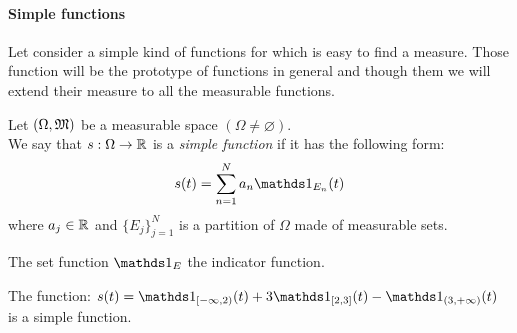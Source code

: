 \paragraph{Simple functions} Let consider a simple kind of functions for which is easy to find a measure. Those function will be the prototype of functions in general and though them we will extend their measure to all the measurable functions.

\begin{defn}\label{simple-function}
	Let $\left(\Omega,\mathfrak M\right)$ be a measurable space $\left(\Omega \neq \varnothing\right)$.\\
	We say that $s:\Omega \to \mathbb R$ is a \emph{simple function} if it has the following form: $$s(t)=\sum_{n=1}^N a_n\Ind_{E_n}(t)$$
	where $a_j \in \mathbb R$ and $\{E_j\}_{j=1}^N$ is a partition of $\Omega$ made of measurable sets.
\end{defn}

The set function $\Ind_{E}$ the indicator function.

\begin{exam}\label{ex:simple-functions}
	The function: $s(t)=\Ind_{[-\infty,2)}(t)+3\Ind_{[2,3]}(t)-\Ind_{(3,+\infty)}(t)$ is a simple function.
\end{exam}

